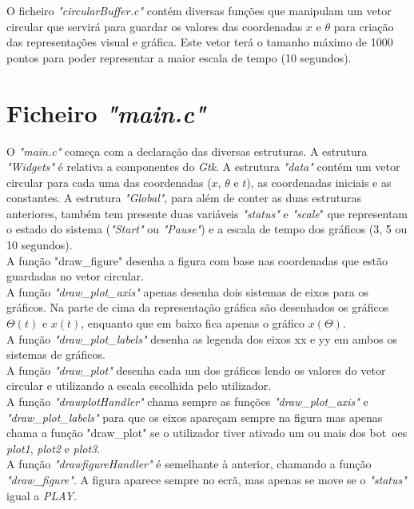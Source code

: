 \documentclass[11pt]{article}
\begin{document}
{
O ficheiro \textit{"circularBuffer.c"} cont\'em diversas fun\c{c}\~oes que manipulam um vetor circular que servir\'a para guardar os valores das coordenadas $x$ e $\theta$ para cria\c{c}\~ao das representa\c{c}\~oes visual e gr\'afica. Este vetor ter\'a o tamanho m\'aximo de 1000 pontos para poder representar a maior escala de tempo (10 segundos).
}

\section{Ficheiro \textit{"main.c"}}

{
O \textit{"main.c"} come\c{c}a com a declara\c{c}\~ao das diversas estruturas. A estrutura \textit{"Widgets"} \'e relativa a componentes do \textit{Gtk}. A estrutura \textit{"data"} cont\'em um vetor circular para cada uma das coordenadas ($x$, $\theta$ e $t$), as coordenadas iniciais e as constantes. A estrutura \textit{"Global"}, para al\'em de conter as duas estruturas anteriores, tamb\'em tem presente duas vari\'aveis \textit{"status"} e \textit{"scale}" que representam o estado do sistema (\textit{"Start"} ou \textit{"Pause"}) e a escala de tempo dos gr\'aficos (3, 5 ou 10 segundos).
\\
\indent
A fun\c{c}\~ao "draw\_figure" desenha a figura com base nas coordenadas que est\~ao guardadas no vetor circular.
\\
\indent
A fun\c{c}\~ao \textit{"draw\_plot\_axis"} apenas desenha dois sistemas de eixos para os gr\'aficos. Na parte de cima da representa\c{c}\~ao gr\'afica s\~ao desenhados os gr\'aficos $\Theta(t)$ e $x(t)$, enquanto que em baixo fica apenas o gr\'afico  $x(\Theta)$. 
\\
\indent
A fun\c{c}\~ao \textit{"draw\_plot\_labels"} desenha as legenda dos eixos xx e yy em ambos os sistemas de gr\'aficos.
\\
\indent
A fun\c{c}\~ao \textit{"draw\_plot"} desenha cada um dos gr\'aficos lendo os valores do vetor circular e utilizando a escala escolhida pelo utilizador.
\\
\indent
A fun\c{c}\~ao \textit{"drawplotHandler"} chama sempre as fun\c{c}\~oes \textit{"draw\_plot\_axis"} e \textit{"draw\_plot\_labels"} para que os eixos apare\c{c}am sempre na figura mas apenas chama a fun\c{c}\~ao "draw\_plot" se o utilizador tiver ativado um ou mais dos bot~oes \textit{plot1}, \textit{plot2} e \textit{plot3}.
\\
\indent
A fun\c{c}\~ao \textit{"drawfigureHandler"} \'e semelhante \`{a} anterior, chamando a fun\c{c}\~ao \textit{"draw\_figure"}. A figura aparece sempre no ecr\~a, mas apenas se move se o \textit{"status"} igual a \textit{PLAY}.
}
\end{document}
